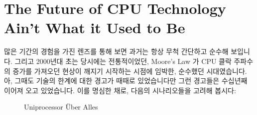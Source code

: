 
\section{The Future of CPU Technology Ain't What it Used to Be}
\label{sec:future:The Future of CPU Technology Ain't What it Used to Be}

많은 기간의 경험을 가진 렌즈를 통해 보면 과거는 항상 무척 간단하고 순수해
보입니다.
그리고 2000년대 초는 당시에는 전통적이었던, Moore's Law 가 CPU 클락 주파수의
증가를 가져오던 현상이 깨지기 시작하는 시점에 임박한, 순수했던 시대였습니다.
아, 그때도 기술의 한계에 대한 경고가 때때로 있었습니다만 그런 경고들은 수십년째
이어져 오고 있었습니다.
이를 명심한 채로, 다음의 시나리오들을 고려해 봅시다:

\begin{figure}[tb]
\centering
{}
\caption{Uniprocessor \"Uber Alles}
\end{figure}

